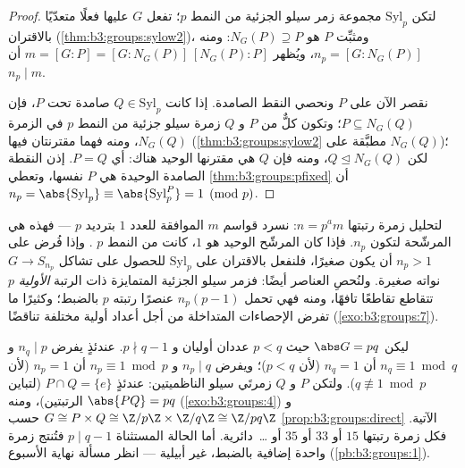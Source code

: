 \begin{proof}
لتكن $\mathrm{Syl}_p$ مجموعة زمر سيلو الجزئية من النمط $p$؛ تفعل
$G$ عليها فعلًا متعدّيًا بالاقتران (\cref{thm:b3:groups:sylow2})، ومثبِّت $P$
هو  $N_G(P) \supseteq P$: ومنه $n_p = [G :
N_G(P)]$، ويُظهر $m = [G:P] = [G:N_G(P)]\,[N_G(P):P]$ أن
$n_p \mid
m$.

نقصر الآن  على $P$ ونحصي النقط الصامدة. إذا كانت $Q \in
\mathrm{Syl}_p$
صامدة تحت  $P$، فإن $P \subseteq N_G(Q)$؛ وتكون كلٌّ من $P$ و $Q$ زمرة
سيلو جزئية من النمط $p$ في الزمرة $N_G(Q)$، ومنه فهما مقترنتان
فيها (\cref{thm:b3:groups:sylow2} مطبَّقة على $N_G(Q)$)؛ لكن $Q \trianglelefteq N_G(Q)$، ومنه
فإن $Q$ هي مقترنها الوحيد هناك: أي $P = Q$. إذن النقطة الصامدة
الوحيدة هي $P$ نفسها، وتعطي \cref{thm:b3:groups:pfixed} أن $n_p = \abs{\mathrm{Syl}_p}
\equiv \abs{\mathrm{Syl}_p^P} = 1 \pmod p$.
\end{proof}

\begin{method}\label{met:b3:groups:sylowmethod}
لتحليل زمرة رتبتها $n = p^a m$: نسرد قواسم $m$ الموافقة للعدد $1$
بترديد $p$ --- فهذه هي المرشّحة لتكون $n_p$. فإذا كان المرشّح
الوحيد هو $1$، كانت  من النمط $p$ . وإذا
فُرض على $n_p > 1$ أن يكون صغيرًا، فلنفعل بالاقتران على
$\mathrm{Syl}_p$ للحصول على تشاكل $G \to S_{n_p}$ نواته صغيرة.
ولنُحصِ العناصر أيضًا: فزمر سيلو الجزئية المتمايزة ذات الرتبة
\emph{الأولية} $p$ تتقاطع تقاطعًا تافهًا، ومنه فهي تحمل
$n_p(p-1)$ عنصرًا رتبته $p$ بالضبط؛ وكثيرًا ما تفرض الإحصاءات
المتداخلة من أجل أعداد أولية مختلفة تناقضًا (\cref{exo:b3:groups:7}).
\end{method}

\begin{example}\label{ex:b3:groups:pq}
ليكن $\abs G = pq$ حيث $p < q$ عددان أوليان و $p \nmid q - 1$.
عندئذٍ يفرض $n_q \mid p$ و $n_q \equiv 1 \bmod q$ أن $n_q = 1$ (لأن $p <
q$)؛
ويفرض $n_p \mid q$ و $n_p \equiv 1 \bmod p$ أن $n_p = 1$ (لأن $q
\not\equiv 1 \bmod p$).
ولتكن $P$ و $Q$ زمرتَي سيلو الناظميتين: عندئذٍ $P
\cap Q = \{e\}$ (لتباين
الرتبتين)، ومنه $\abs{PQ} = pq$ (\cref{exo:b3:groups:4}) و $G \cong P \times Q \cong \Z/p\Z
\times \Z/q\Z \cong \Z/pq\Z$ حسب
\cref{prop:b3:groups:direct} الآتية. فكل زمرة رتبتها $15$ أو $33$ أو $35$
أو \dots\ دائرية. أما الحالة المستثناة $p \mid q - 1$ فتُنتج زمرة
واحدة إضافية بالضبط، غير أبيلية --- انظر مسألة نهاية الأسبوع
(\cref{pb:b3:groups:1}).
\end{example}

